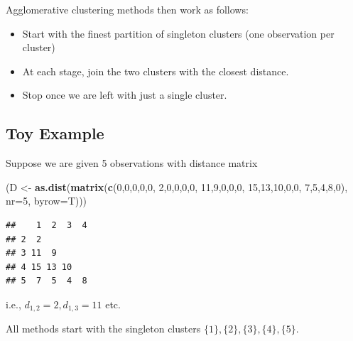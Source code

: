 \documentclass[
]{book}
\newenvironment{Shaded}{\begin{snugshade}}{\end{snugshade}}
\newcommand{\AttributeTok}[1]{\textcolor[rgb]{0.13,0.29,0.53}{#1}}
\newcommand{\DecValTok}[1]{\textcolor[rgb]{0.00,0.00,0.81}{#1}}
\newcommand{\FunctionTok}[1]{\textcolor[rgb]{0.13,0.29,0.53}{\textbf{#1}}}
\newcommand{\NormalTok}[1]{#1}
\newcommand{\OtherTok}[1]{\textcolor[rgb]{0.56,0.35,0.01}{#1}}
\theoremstyle{definition}
\theoremstyle{definition}
\theoremstyle{definition}
\theoremstyle{definition}
\theoremstyle{remark}
\begin{document}
Agglomerative clustering methods then work as follows:

\begin{itemize}
\item
  Start with the finest partition of singleton clusters (one observation per cluster)
\item
  At each stage, join the two clusters with the closest distance.
\item
  Stop once we are left with just a single cluster.
\end{itemize}

\subsection{Toy Example}\label{toy-example}

Suppose we are given 5 observations with distance matrix

\begin{Shaded}
\begin{Highlighting}[]
\NormalTok{(D }\OtherTok{\textless{}{-}} \FunctionTok{as.dist}\NormalTok{(}\FunctionTok{matrix}\NormalTok{(}\FunctionTok{c}\NormalTok{(}\DecValTok{0}\NormalTok{,}\DecValTok{0}\NormalTok{,}\DecValTok{0}\NormalTok{,}\DecValTok{0}\NormalTok{,}\DecValTok{0}\NormalTok{,}
                      \DecValTok{2}\NormalTok{,}\DecValTok{0}\NormalTok{,}\DecValTok{0}\NormalTok{,}\DecValTok{0}\NormalTok{,}\DecValTok{0}\NormalTok{,}
                      \DecValTok{11}\NormalTok{,}\DecValTok{9}\NormalTok{,}\DecValTok{0}\NormalTok{,}\DecValTok{0}\NormalTok{,}\DecValTok{0}\NormalTok{,}
                      \DecValTok{15}\NormalTok{,}\DecValTok{13}\NormalTok{,}\DecValTok{10}\NormalTok{,}\DecValTok{0}\NormalTok{,}\DecValTok{0}\NormalTok{,}
                      \DecValTok{7}\NormalTok{,}\DecValTok{5}\NormalTok{,}\DecValTok{4}\NormalTok{,}\DecValTok{8}\NormalTok{,}\DecValTok{0}\NormalTok{), }\AttributeTok{nr=}\DecValTok{5}\NormalTok{, }\AttributeTok{byrow=}\NormalTok{T)))}
\end{Highlighting}
\end{Shaded}

\begin{verbatim}
##    1  2  3  4
## 2  2         
## 3 11  9      
## 4 15 13 10   
## 5  7  5  4  8
\end{verbatim}

i.e., \(d_{1,2}=2, d_{1,3}=11\) etc.

All methods start with the singleton clusters \(\{1\},\{2\},\{3\},\{4\},\{5\}\).
\end{document}
